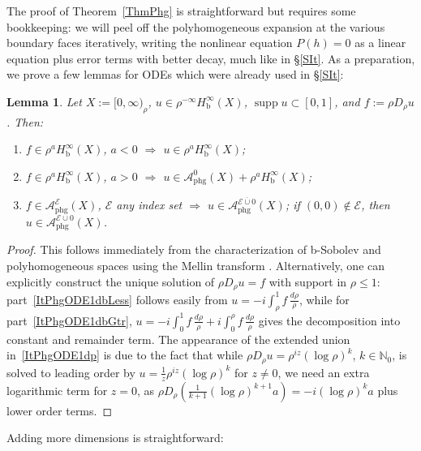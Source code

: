 \documentclass[reqno,11pt,letterpaper]{amsart}
\numberwithin{equation}{section}
\numberwithin{figure}{section}
\newtheorem{lemma}[thm]{Lemma}
\theoremstyle{definition}
\theoremstyle{remark}
\newcommand{\mc}{\mathcal}
\newcommand{\cA}{\mc A}
\newcommand{\cE}{\mc E}
\newcommand{\N}{\mathbb{N}}
\newcommand{\supp}{\operatorname{supp}}
\newcommand{\extcup}{\operatorname{\ol\cup}}
\newcommand{\ol}{\overline}
\newcommand{\bop}{{\mathrm{b}}}
\newcommand{\Hb}{H_{\bop}}
\newcommand{\phg}{{\mathrm{phg}}}
\begin{document}
The proof of Theorem~\ref{ThmPhg} is straightforward but requires some bookkeeping: we will peel off the polyhomogeneous expansion at the various boundary faces iteratively, writing the nonlinear equation $P(h)=0$ as a linear equation plus error terms with better decay, much like in \S\ref{SIt}. As a preparation, we prove a few lemmas for ODEs which were already used in \S\ref{SIt}:
\begin{lemma}
\label{LemmaPhgODE1d}
  Let $X:=[0,\infty)_\rho$, $u\in\rho^{-\infty}\Hb^\infty(X)$, $\supp u\subset[0,1]$, and $f:=\rho D_\rho u$. Then:
  \begin{enumerate}
  \item\label{ItPhgODE1dbLess} $f\in\rho^a\Hb^\infty(X)$, $a<0$ $\Rightarrow$ $u\in\rho^a\Hb^\infty(X)$;
  \item\label{ItPhgODE1dbGtr} $f\in\rho^a\Hb^\infty(X)$, $a>0$ $\Rightarrow$ $u\in\cA_\phg^0(X)+\rho^a\Hb^\infty(X)$;
  \item\label{ItPhgODE1dp} $f\in\cA_\phg^\cE(X)$, $\cE$ any index set $\Rightarrow$ $u\in\cA_\phg^{\cE\extcup 0}(X)$; if $(0,0)\notin\cE$, then $u\in\cA_\phg^{\cE\cup 0}(X)$.
  \end{enumerate}
\end{lemma}
\begin{proof}
  This follows immediately from the characterization of b-Sobolev and polyhomogeneous spaces using the Mellin transform \cite[\S4]{MelroseDiffOnMwc}. Alternatively, one can explicitly construct the unique solution of $\rho D_\rho u=f$ with support in $\rho\leq 1$: part~\eqref{ItPhgODE1dbLess} follows easily from $u=-i\int_\rho^1 f\,\frac{d\rho}{\rho}$, while for part~\eqref{ItPhgODE1dbGtr}, $u=-i\int_0^1 f\,\frac{d\rho}{\rho}+i\int_0^\rho f\,\frac{d\rho}{\rho}$ gives the decomposition into constant and remainder term. The appearance of the extended union in~\eqref{ItPhgODE1dp} is due to the fact that while $\rho D_\rho u=\rho^{i z}(\log\rho)^k$, $k\in\N_0$, is solved to leading order by $u=\tfrac{1}{z}\rho^{i z}(\log\rho)^k$ for $z\neq 0$, we need an extra logarithmic term for $z=0$, as $\rho D_\rho(\tfrac{1}{k+1}(\log\rho)^{k+1} a)=-i(\log\rho)^k a$ plus lower order terms.
\end{proof}

Adding more dimensions is straightforward:
\end{document}
